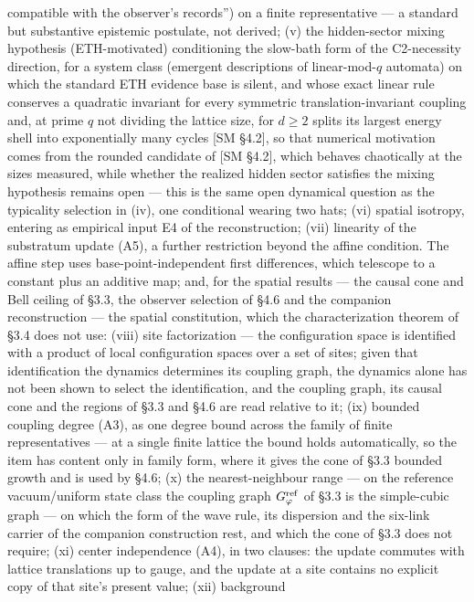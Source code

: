 \documentclass[
]{article}
\begin{document}
compatible with the observer's records'') on a finite representative ---
a standard but substantive epistemic postulate, not derived; (v) the
hidden-sector mixing hypothesis (ETH-motivated) conditioning the
slow-bath form of the C2-necessity direction, for a system class
(emergent descriptions of linear-mod-\(q\) automata) on which the
standard ETH evidence base is silent, and whose exact linear rule
conserves a quadratic invariant for every symmetric
translation-invariant coupling and, at prime \(q\) not dividing the
lattice size, for \(d\ge2\) splits its largest energy shell into
exponentially many cycles {[}SM §4.2{]}, so that numerical motivation
comes from the rounded candidate of {[}SM §4.2{]}, which behaves
chaotically at the sizes measured, while whether the realized hidden
sector satisfies the mixing hypothesis remains open --- this is the same
open dynamical question as the typicality selection in (iv), one
conditional wearing two hats; (vi) spatial isotropy, entering as
empirical input E4 of the reconstruction; (vii) linearity of the
substratum update (A5), a further restriction beyond the affine
condition. The affine step uses base-point-independent first
differences, which telescope to a constant plus an additive map; and,
for the spatial results --- the causal cone and Bell ceiling of §3.3,
the observer selection of §4.6 and the companion reconstruction --- the
spatial constitution, which the characterization theorem of §3.4 does
not use: (viii) site factorization --- the configuration space is
identified with a product of local configuration spaces over a set of
sites; given that identification the dynamics determines its coupling
graph, the dynamics alone has not been shown to select the
identification, and the coupling graph, its causal cone and the regions
of §3.3 and §4.6 are read relative to it; (ix) bounded coupling degree
(A3), as one degree bound across the family of finite representatives
--- at a single finite lattice the bound holds automatically, so the
item has content only in family form, where it gives the cone of §3.3
bounded growth and is used by §4.6; (x) the nearest-neighbour range ---
on the reference vacuum/uniform state class the coupling graph
\(G_\varphi^{\rm ref}\) of §3.3 is the simple-cubic graph --- on which
the form of the wave rule, its dispersion and the six-link carrier of
the companion construction rest, and which the cone of §3.3 does not
require; (xi) center independence (A4), in two clauses: the update
commutes with lattice translations up to gauge, and the update at a site
contains no explicit copy of that site's present value; (xii) background
\end{document}
